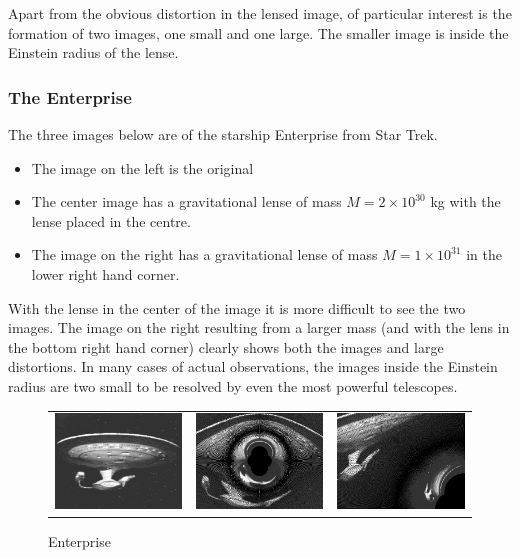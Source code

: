 \documentclass[a4paper]{IEEEtran}
\begin{document}
Apart from the obvious distortion in the lensed image, of particular
interest is the formation of two images, one small and one large.
The smaller image is inside the Einstein radius of the lense.

\subsubsection{The Enterprise}
The three images below are of the starship Enterprise from Star Trek.
\begin{itemize}
    \item The image on the left is the original
    \item The center image has a gravitational lense of mass
          $M = 2 \times 10^{30}$ kg with the lense placed in the 
          centre.
    \item The image on the right has a gravitational lense of
          mass $M = 1 \times 10^{31}$ in the lower right hand corner.
\end{itemize}
With the lense in the center of the image it is more difficult to 
see the two images. The image on the right resulting from a larger
mass (and with the lens in the bottom right hand corner)
clearly shows both the images and large distortions.
In many cases of actual observations, the images inside the Einstein radius
are two small to be resolved by even the most powerful telescopes.

\begin{figure}
    \caption{Enterprise} 
    \label{fig:enterprise} 
    \begin{center}
        \begin{tabular}{ccc}
            \includegraphics[width=0.3\columnwidth]{pics/1701.eps} &
            \includegraphics[width=0.3\columnwidth]{pics/ent_2e30.eps} &
            \includegraphics[width=0.3\columnwidth]{pics/ent_1e31.eps} 
        \end{tabular}
    \end{center}
\end{figure}
\end{document}
